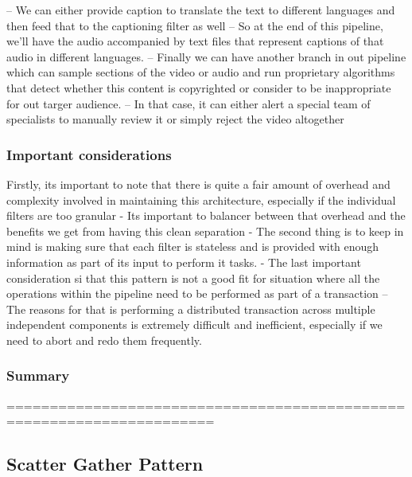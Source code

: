 \documentclass[a4paper, 11pt]{book}
\begin{document}
{    -- We can either provide caption to translate the text to different languages and then feed that to the captioning filter as well
    -- So at the end of this pipeline, we'll have the audio accompanied by text files that represent captions of that audio in different languages.
    -- Finally we can have another branch in out pipeline which can sample sections of the video or audio and run proprietary algorithms that detect whether this content is copyrighted or consider to be inappropriate for out targer audience.
    -- In that case, it can either alert a special team of specialists to manually review it or simply reject the video altogether

    \subsubsection{Important considerations}
    Firstly, its important to note that there is quite a fair amount of overhead and complexity involved in maintaining this architecture, especially if the individual filters are too granular
    - Its important to balancer between that overhead and the benefits we get from having this clean separation
    - The second thing is to keep in mind is making sure that each filter is stateless and is provided with enough information as part of its input to perform it tasks.
    - The last important consideration si that this pattern is not a good fit for situation where all the operations within the pipeline need to be performed as part of a transaction
    -- The reasons for that is performing a distributed transaction across multiple independent components is extremely difficult and inefficient, especially if we need to abort and redo them frequently.

    \subsubsection{Summary}
    ======================================================================

    \subsection{Scatter Gather Pattern}

}
\end{document}
